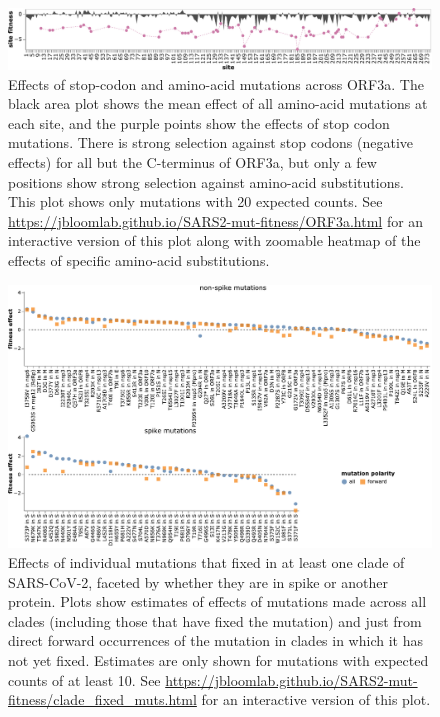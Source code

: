 \documentclass[9pt,twocolumn,twoside]{gsajnl_modified}
\begin{document}
\begin{figure}[h]
\includegraphics[width=\linewidth]{figs/ORF3a.pdf}
\caption{
Effects of stop-codon and amino-acid mutations across ORF3a.
The black area plot shows the mean effect of all amino-acid mutations at each site, and the purple points show the effects of stop codon mutations.
There is strong selection against stop codons (negative effects) for all but the C-terminus of ORF3a, but only a few positions show strong selection against amino-acid substitutions.
This plot shows only mutations with 20 expected counts.
See \url{https://jbloomlab.github.io/SARS2-mut-fitness/ORF3a.html} for an interactive version of this plot along with zoomable heatmap of the effects of specific amino-acid substitutions.
\label{fig:ORF3a}
}
\end{figure}

\begin{figure}[b]
\includegraphics[width=\linewidth]{figs/fixed.pdf}
\caption{
Effects of individual mutations that fixed in at least one clade of SARS-CoV-2, faceted by whether they are in spike or another protein.
Plots show estimates of effects of mutations made across all clades (including those that have fixed the mutation) and just from direct forward occurrences of the mutation in clades in which it has not yet fixed.
Estimates are only shown for mutations with expected counts of at least 10.
See \url{https://jbloomlab.github.io/SARS2-mut-fitness/clade_fixed_muts.html} for an interactive version of this plot.
\label{fig:fixed}
}
\end{figure}
\end{document}
